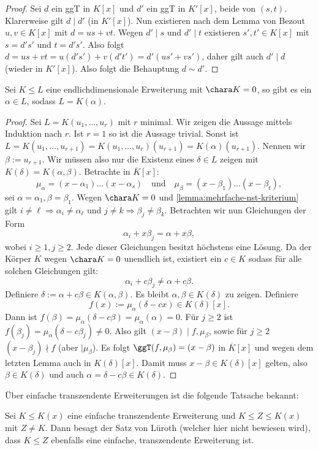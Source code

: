 \begin{proof}
    Sei $d$ ein ggT in $K[x]$ und $d'$ ein ggT in $K'[x]$, beide von $(s,t)$. Klarerweise gilt $d\mid d'$ (in $K'[x]$). Nun existieren nach dem Lemma von Bezout $u,v\in K[x]$ mit $d=us+vt$. Wegen $d'\mid s$ und $d'\mid t$ existieren $s',t'\in K[x]$ mit $s=d's'$ und $t=d's'$. Also folgt $d=us+vt=u(d's')+v(d't')=d'(us'+vs')$, daher gilt auch $d'\mid d$ (wieder in $K'[x]$). Also folgt die Behauptung $d\sim d'$.
\end{proof}

\begin{theorem}\label{theorem:primitives_element}
    Sei $K \leq L$ eine endlichdimensionale Erweiterung mit $\chara K = 0$, so gibt es ein $\alpha \in L$, sodass $L = K(\alpha)$.
\end{theorem}

\begin{proof}
    Sei $L = K(u_1, \hdots, u_r)$ mit $r$ minimal. Wir zeigen die Aussage mittels Induktion nach $r$. Ist $r = 1$ so ist die Aussage trivial. Sonst ist $L = K(u_1, \hdots, u_{r+1}) = K(u_1, \hdots, u_r)(u_{r+1}) = K(\alpha)(u_{r+1})$. Nennen wir $\beta := u_{r+1}$. Wir müssen also nur die Existenz eines $\delta \in L$ zeigen mit $K(\delta) = K(\alpha, \beta)$. Betrachte in $\overline{K}[x]$:
    $$ \mu_\alpha = (x - \alpha_1) \hdots (x - \alpha_s) \quad \mathrm{und}\quad
     \mu_\beta = (x - \beta_1) \hdots (x - \beta_t),$$ sei $\alpha = \alpha_1, \beta = \beta_1$. Wegen $\chara K = 0$ und \cref{lemma:mehrfache-nst-kriterium} gilt $i\neq \ell\Rightarrow\alpha_i\neq\alpha_\ell$ und $j\neq k\Rightarrow \beta_j\neq\beta_k$. Betrachten wir nun Gleichungen der Form
    $$ \alpha_i + x \beta_j = \alpha + x \beta, $$
    wobei $i \geq 1, j \geq 2$. Jede dieser Gleichungen besitzt höchstens eine Lösung. Da der Körper $K$ wegen $\chara K=0$ unendlich ist, existiert ein $c \in K$ sodass für alle solchen Gleichungen gilt: $$ \alpha_i + c \beta_j \neq \alpha + c \beta. $$
    Definiere $\delta := \alpha + c \beta \in K(\alpha, \beta)$. Es bleibt $\alpha, \beta \in K(\delta)$ zu zeigen. Definiere
    $$ f(x) := \mu_\alpha (\delta - cx) \in K(\delta)[x]. $$
    Dann ist $f(\beta) = \mu_\alpha(\delta - c \beta) = \mu_\alpha(\alpha) = 0$. Für $j \geq 2$ ist $f(\beta_j) = \mu_\alpha(\delta - c \beta_j) \neq 0$. Also gilt $(x - \beta) \mid f, \mu_\beta$, sowie für $j \geq 2$ $(x-\beta_j) \nmid f$ (aber $\mid \mu_\beta$). Es folgt $\ggT(f,\mu_\beta)=(x-\beta)$ in $\overline{K}[x]$ und wegen dem letzten Lemma auch in $K(\delta)[x]$. Damit muss $x-\beta\in K(\delta)[x]$ gelten, also $\beta\in K(\delta)$ und auch $\alpha=\delta-c\beta\in K(\delta)$.
\end{proof}

Über einfache transzendente Erweiterungen ist die folgende Tatsache bekannt:
\begin{remark}
    Sei $K\leq K(x)$ eine einfache transzendente Erweiterung und $K\le Z\le K(x)$ mit $Z\neq K$. Dann besagt der Satz von Lüroth (welcher hier nicht bewiesen wird), dass $K \leq Z$ ebenfalls eine einfache, transzendente Erweiterung ist.
\end{remark}
